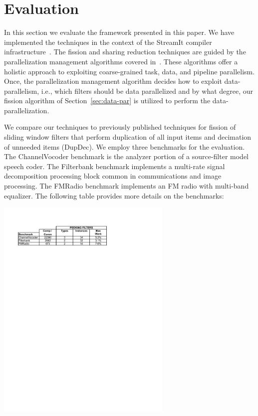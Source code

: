 \section{Evaluation}
\label{sec:eval}

In this section we evaluate the framework presented in this paper.  We
have implemented the techniques in the context of the StreamIt
compiler infrastructure~\cite{gordon-asplos06}.  The fission and
sharing reduction techniques are guided by the parallelization
management algorithms covered in~\cite{gordon-asplos06}.  These
algorithms offer a holistic approach to exploiting coarse-grained
task, data, and pipeline parallelism.   Once, the parallelization management
algorithm decides how to exploit data-parallelism, i.e., which
filters should be data parallelized and by what degree, our fission
algorithm of Section~\ref{sec:data-par} is utilized to perform the
data-parallelization. 

We compare our techniques to previously published techniques for
fission of sliding window filters that perform duplication of all
input items and decimation of unneeded items (DupDec).  We employ
three benchmarks for the evaluation.  The ChannelVocoder benchmark is
the analyzer portion of a source-filter model speech coder.  The
Filterbank benchmark implements a multi-rate signal decomposition
processing block common in communications and image processing.  The
FMRadio benchmark implements an FM radio with multi-band equalizer.
The following table provides more details on the benchmarks:


{\centering
\includegraphics[width=3.3in]{figures/bench-char.pdf}}

